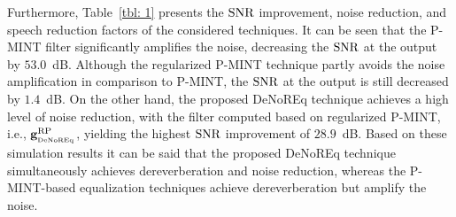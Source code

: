 \documentclass{article}
\begin{document}
Furthermore, Table~\ref{tbl: 1} presents the $\rm SNR$ improvement, noise reduction, and speech reduction factors of the considered techniques.
It can be seen that the P-MINT filter significantly amplifies the noise, decreasing the $\rm SNR$ at the output by $53.0$~dB.
Although the regularized P-MINT technique partly avoids the noise amplification in comparison to P-MINT, the $\rm SNR$ at the output is still decreased by $1.4$~dB.
On the other hand, the proposed DeNoREq technique achieves a high level of noise reduction, with the filter computed based on regularized P-MINT, i.e., $\mathbf{g}_{_{\rm DeNoREq}}^{\rm RP}$, yielding the highest $\rm SNR$ improvement of $28.9$~dB.
Based on these simulation results it can be said that the proposed DeNoREq technique simultaneously achieves dereverberation and noise reduction, whereas the P-MINT-based equalization techniques achieve dereverberation but amplify the noise. 
\end{document}
